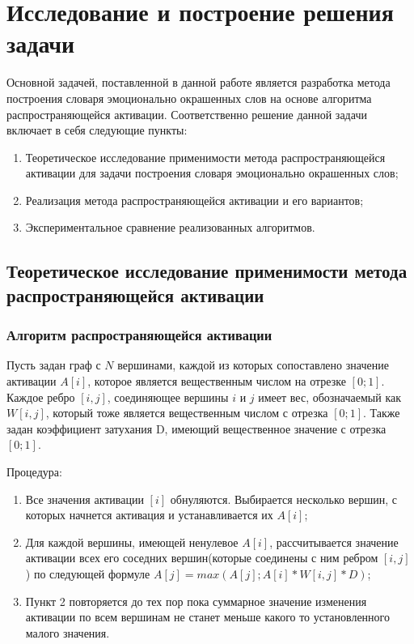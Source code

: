\chapter{Исследование и построение решения задачи}

Основной задачей, поставленной в данной работе является разработка метода
построения словаря эмоционально окрашенных слов на основе алгоритма
распространяющейся активации. Соответственно решение данной задачи включает в
себя следующие пункты:

\begin{enumerate}
  \item Теоретическое исследование применимости метода распространяющейся
    активации для задачи построения словаря эмоционально окрашенных слов;
  \item Реализация метода распространяющейся активации и его вариантов;
  \item Экспериментальное сравнение реализованных алгоритмов.
\end{enumerate} 

\section{Теоретическое исследование применимости метода распространяющейся
  активации}
\subsection{Алгоритм распространяющейся активации}
Пусть задан граф с $N$ вершинами, каждой из которых сопоставлено значение
активации $A[i]$, которое является вещественным числом на отрезке $[0; 1]$.
Каждое ребро $[i, j]$, соединяющее вершины $i$ и $j$ имеет вес, обозначаемый как
$W[i, j]$, который тоже является вещественным числом с отрезка $[0; 1]$. Также
задан коэффициент затухания D, имеющий вещественное значение с отрезка $[0; 1]$.

Процедура:
\begin{enumerate}
\item Все значения активации $[i]$ обнуляются. Выбирается несколько вершин, с
  которых начнется активация и устанавливается их $A[i]$;
\item Для каждой вершины, имеющей ненулевое $A[i]$, рассчитывается значение
  активации всех его соседних вершин(которые соединены с ним ребром $[i, j]$) по
  следующей формуле $A[j] = max(A[j]; A[i] * W[i, j] * D)$;
\item Пункт 2 повторяется до тех пор пока суммарное значение изменения активации
  по всем вершинам не станет меньше какого то установленного малого значения.
\end{enumerate}

